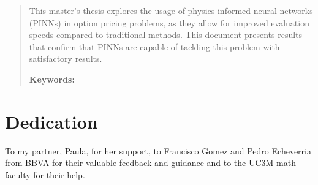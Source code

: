\documentclass[12pt]{report} %
\theoremstyle{plain}           %
\theoremstyle{definition}      %
\theoremstyle{remark}          %
\begin{document}
\newpage %
\thispagestyle{empty}
\mbox{}

\renewcommand\abstractname{\large\bfseries\filcenter\uppercase{Summary}}
\begin{abstract}
\thispagestyle{plain}
\setcounter{page}{3}
	

This master's thesis explores the usage of physics-informed neural networks (PINNs) in 
option pricing problems, as they allow for improved evaluation speeds compared to traditional methods. This 
document presents results that confirm that PINNs are capable of tackling this problem with 
satisfactory results.
	
	\textbf{Keywords:} %
	
	\vfill
\end{abstract}
	\newpage %
	\thispagestyle{empty}
	\mbox{}


\chapter*{Dedication}

\setcounter{page}{5}
	
    To my partner, Paula, for her support, to Francisco Gomez and Pedro Echeverria from BBVA for their valuable feedback and guidance and to the UC3M math faculty for their help.
	\vfill
	
	\newpage %
	\thispagestyle{empty}
	\mbox{}
	


\tableofcontents
\thispagestyle{fancy}

\newpage %
\thispagestyle{empty}
\mbox{}

\listoffigures
\thispagestyle{fancy}

\newpage %
\thispagestyle{empty}
\mbox{}

\listoftables
\thispagestyle{fancy}

\newpage %
\thispagestyle{empty}
\mbox{}


\clearpage
{} %
\end{document}

